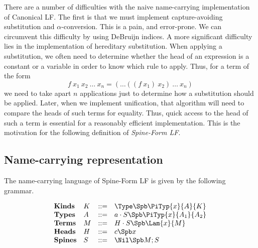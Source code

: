 There are a number of difficulties with the naive name-carrying
implementation of Canonical LF.  The first is that we must
implement capture-avoiding substitution and $\alpha$-conversion.
This is a pain, and error-prone.  We can circumvent this difficulty
by using DeBruijn indices\cite{DeBruijn80}.  A more significant 
difficulty lies in the implementation of hereditary substitution. 
When applying a substitution, we often need to determine whether
the head of an expression is a constant or a variable in order
to know which rule to apply.  Thus, for a term of the form
$$f\ x_1\ x_2\ \ldots\ x_n = (\ldots((f\ x_1)\ x_2)\ \ldots\ x_n) $$
we need to take apart $n$ applications just to determine how
a substitution should be applied.  Later, when we implement
unification, that algorithm will need to compare the heads
of such terms for equality.  Thus, quick access to the head
of such a term is essential for a reasonably efficient implementation.
This is the motivation for the following definition of 
\emph{Spine-Form LF}.

\subsection{Name-carrying representation}

The name-carrying language of Spine-Form LF is given by the following
grammar.

$$
\begin{array}{llll}
\mathbf{Kinds} & K & ::= & \Type \Spb \PiTyp{x}{A}{K} \\
\mathbf{Types} & A & ::= & a\cdot S \Spb \PiTyp{x}{A_1}{A_2} \\
\mathbf{Terms} & M & ::= & H\cdot S \Spb \Lam{x}{M} \\
\mathbf{Heads} & H & ::= & c \Spb x\\
\mathbf{Spines} & S & ::= & \Nil \Spb M;S\\
\end{array} 
$$
